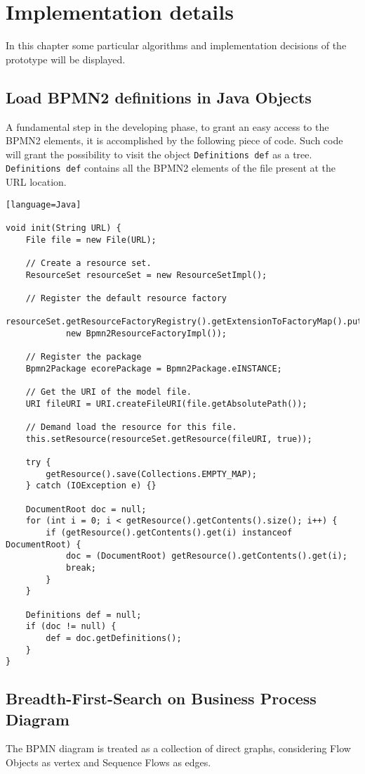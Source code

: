 
\chapter{Implementation details}
\label{cha:789}
In this chapter some particular algorithms and implementation decisions of the prototype will be displayed.


\section{Load BPMN2 definitions in Java Objects}
\label{sec:456}
A fundamental step in the developing phase, to grant an easy access to the BPMN2 elements, it is accomplished by the following piece of code. Such code will grant the possibility to visit the object \texttt{Definitions def} as a tree. \texttt{Definitions def} contains all the BPMN2 elements of the file present at the URL location.

\begin{lstlisting}[caption=load BPMN in Java.][language=Java]

void init(String URL) {
	File file = new File(URL);

	// Create a resource set.
	ResourceSet resourceSet = new ResourceSetImpl();

	// Register the default resource factory
	resourceSet.getResourceFactoryRegistry().getExtensionToFactoryMap().put("bpmn2",
			new Bpmn2ResourceFactoryImpl());

	// Register the package
	Bpmn2Package ecorePackage = Bpmn2Package.eINSTANCE;

	// Get the URI of the model file.
	URI fileURI = URI.createFileURI(file.getAbsolutePath());

	// Demand load the resource for this file.
	this.setResource(resourceSet.getResource(fileURI, true));

	try {
		getResource().save(Collections.EMPTY_MAP);
	} catch (IOException e) {}

	DocumentRoot doc = null;
	for (int i = 0; i < getResource().getContents().size(); i++) {
		if (getResource().getContents().get(i) instanceof DocumentRoot) {
			doc = (DocumentRoot) getResource().getContents().get(i);
			break;
		}
	}

	Definitions def = null;
	if (doc != null) {
		def = doc.getDefinitions();
	}
}
\end{lstlisting}


\section{Breadth-First-Search on Business Process Diagram}
\label{sec:456}
The BPMN diagram is treated as a collection of direct graphs, considering Flow Objects as vertex and Sequence Flows as edges.


